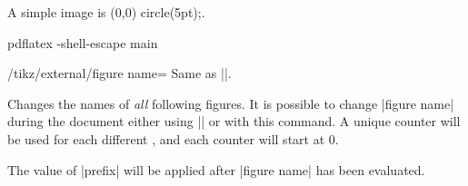 {\begin{command}{}
\begin{codeexample}
\usetikzlibrary{external}




A simple image is \tikz \fill (0,0) circle(5pt);. %


\end{codeexample}
\begin{codeexample}
pdflatex -shell-escape main
\end{codeexample}
\end{command}

\begin{key}{/tikz/external/figure name=}
	Same as ||.
\end{key}
\begin{command}{}
	Changes the names of \emph{all} following figures. It is possible to change |figure name| during the document either using || or with this command. A unique counter will be used for each different , and each counter will start at $0$.

	The value of |prefix| will be applied after |figure name| has been evaluated.
\end{command}}
